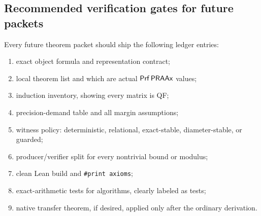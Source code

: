 \subsection{Recommended verification gates for future packets}

Every future theorem packet should ship the following ledger entries:
\begin{enumerate}[label=(\arabic*)]
  \item exact object formula and representation contract;
  \item local theorem list and which are actual \(\mathsf{Prf}\,\mathsf{PRAAx}\) values;
  \item induction inventory, showing every matrix is QF;
  \item precision-demand table and all margin assumptions;
  \item witness policy: deterministic, relational, exact-stable, diameter-stable, or guarded;
  \item producer/verifier split for every nontrivial bound or modulus;
  \item clean Lean build and \texttt{\#print axioms};
  \item exact-arithmetic tests for algorithms, clearly labeled as tests;
  \item native transfer theorem, if desired, applied only after the ordinary derivation.
\end{enumerate}
